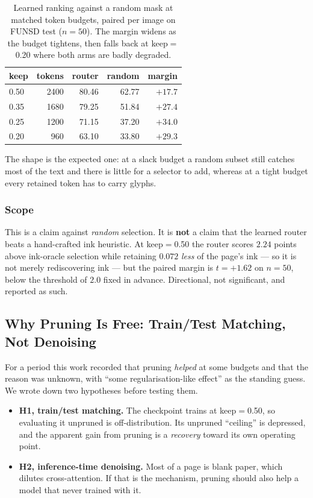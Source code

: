 \documentclass[conference]{IEEEtran}
\begin{document}
\begin{table}[htbp]
\caption{Learned ranking against a random mask at matched token budgets, paired per image on
FUNSD test ($n = 50$). The margin widens as the budget tightens, then falls back at
keep$=$0.20 where both arms are badly degraded.}
\label{tab:selection}
\centering
\begin{tabular}{@{}lrrrr@{}}
\toprule
keep & tokens & router & random & margin \\
\midrule
0.50 & 2400 & 80.46 & 62.77 & $\bm{+17.7}$ \\
0.35 & 1680 & 79.25 & 51.84 & $\bm{+27.4}$ \\
0.25 & 1200 & 71.15 & 37.20 & $\bm{+34.0}$ \\
0.20 & \ \,960 & 63.10 & 33.80 & $\bm{+29.3}$ \\
\bottomrule
\end{tabular}
\end{table}

The shape is the expected one: at a slack budget a random subset still catches most of the
text and there is little for a selector to add, whereas at a tight budget every retained
token has to carry glyphs.

\subsubsection{Scope}
This is a claim against \emph{random} selection. It is \textbf{not} a claim that the learned
router beats a hand-crafted ink heuristic. At keep$=$0.50 the router scores $2.24$ points
above ink-oracle selection while retaining $0.072$ \emph{less} of the page's ink --- so it is
not merely rediscovering ink --- but the paired margin is $t = +1.62$ on $n = 50$, below the
threshold of $2.0$ fixed in advance. Directional, not significant, and reported as such.

\subsection{Why Pruning Is Free: Train/Test Matching, Not Denoising}
\label{sec:why}

For a period this work recorded that pruning \emph{helped} at some budgets and that the
reason was unknown, with ``some regularisation-like effect'' as the standing guess. We wrote
down two hypotheses before testing them.

\begin{itemize}
\item \textbf{H1, train/test matching.} The checkpoint trains at keep$=$0.50, so evaluating
it unpruned is off-distribution. Its unpruned ``ceiling'' is depressed, and the apparent gain
from pruning is a \emph{recovery} toward its own operating point.
\item \textbf{H2, inference-time denoising.} Most of a page is blank paper, which dilutes
cross-attention. If that is the mechanism, pruning should also help a model that never
trained with it.
\end{itemize}
\end{document}
